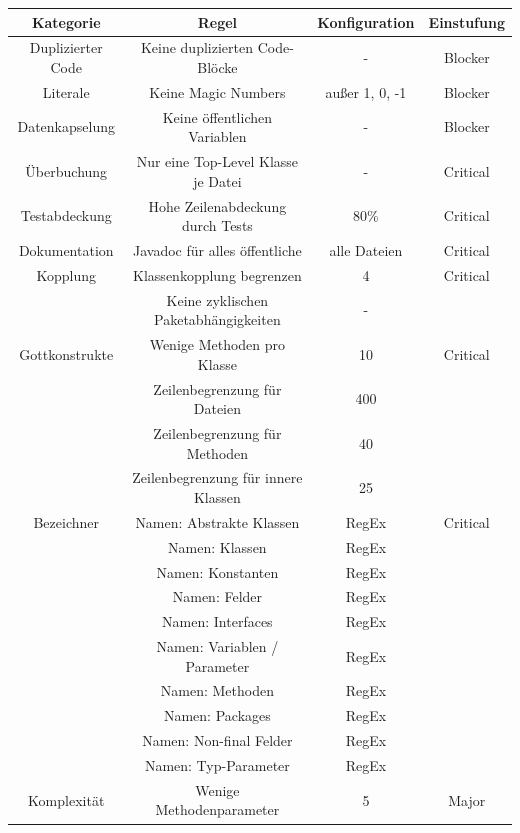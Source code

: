\documentclass[da,ngerman]{stthesis}
\begin{document}
				\begin{center}
					\tabulinesep=1.5mm
					\begin{longtabu}{|c|c|c|c|}
						\hline
  						\textbf{Kategorie} & \textbf{Regel} & \textbf{Konfiguration} & \textbf{Einstufung}\\
  						\hline 
  						Duplizierter Code & Keine duplizierten Code-Blöcke & - & Blocker \\
  						\hline
						Literale & Keine Magic Numbers & außer 1, 0, -1 & Blocker \\
  						\hline
  						Datenkapselung & Keine öffentlichen Variablen & - & Blocker \\
  						\hline 
  						Überbuchung & Nur eine Top-Level Klasse je Datei & - & Critical \\
  						\hline
  						Testabdeckung & Hohe Zeilenabdeckung durch Tests & 80\% & Critical \\
  						\hline
  						Dokumentation & Javadoc für alles öffentliche & alle Dateien & Critical \\
  						\hline
  						Kopplung & Klassenkopplung begrenzen & 4 & Critical \\
  						& Keine zyklischen Paketabhängigkeiten & - & \\
  						\hline
  						Gottkonstrukte & Wenige Methoden pro Klasse & 10 & Critical \\
  						& Zeilenbegrenzung für Dateien & 400 & \\
  						& Zeilenbegrenzung für Methoden & 40 & \\
  						& Zeilenbegrenzung für innere Klassen & 25 & \\
  						\hline
  						Bezeichner & Namen: Abstrakte Klassen & RegEx & Critical \\
  						& Namen: Klassen & RegEx & \\
  						& Namen: Konstanten & RegEx & \\
  						& Namen: Felder & RegEx & \\
  						& Namen: Interfaces & RegEx & \\
  						& Namen: Variablen / Parameter & RegEx & \\
  						& Namen: Methoden & RegEx & \\
  						& Namen: Packages & RegEx & \\
  						& Namen: Non-final Felder & RegEx & \\
  						& Namen: Typ-Parameter & RegEx & \\
  						\hline
  						Komplexität & Wenige Methodenparameter & 5 & Major \\

\end{longtabu}
\end{center}
\end{document}
